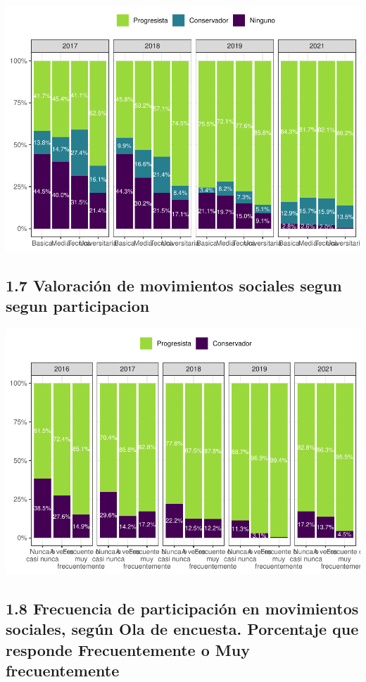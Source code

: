 \documentclass[
  12pt,
  openany]{book}
\begin{document}
\includegraphics{reporte-elsoc_files/figure-latex/unnamed-chunk-11-1.pdf}

\hypertarget{valoraciuxf3n-de-movimientos-sociales-segun-segun-participacion}{%
\subsection{1.7 Valoración de movimientos sociales segun segun participacion}\label{valoraciuxf3n-de-movimientos-sociales-segun-segun-participacion}}

\includegraphics{reporte-elsoc_files/figure-latex/unnamed-chunk-12-1.pdf}

\hypertarget{frecuencia-de-participaciuxf3n-en-movimientos-sociales-seguxfan-ola-de-encuesta.-porcentaje-que-responde-frecuentemente-o-muy-frecuentemente}{%
\subsection{1.8 Frecuencia de participación en movimientos sociales, según Ola de encuesta. Porcentaje que responde Frecuentemente o Muy frecuentemente}\label{frecuencia-de-participaciuxf3n-en-movimientos-sociales-seguxfan-ola-de-encuesta.-porcentaje-que-responde-frecuentemente-o-muy-frecuentemente}}
\end{document}
